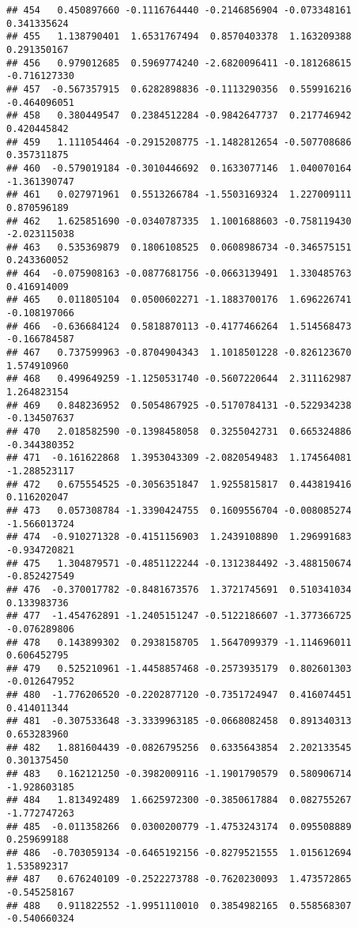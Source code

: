 \documentclass[
]{article}
\begin{document}
\begin{verbatim}
## 454   0.450897660 -0.1116764440 -0.2146856904 -0.073348161  0.341335624
## 455   1.138790401  1.6531767494  0.8570403378  1.163209388  0.291350167
## 456   0.979012685  0.5969774240 -2.6820096411 -0.181268615 -0.716127330
## 457  -0.567357915  0.6282898836 -0.1113290356  0.559916216 -0.464096051
## 458   0.380449547  0.2384512284 -0.9842647737  0.217746942  0.420445842
## 459   1.111054464 -0.2915208775 -1.1482812654 -0.507708686  0.357311875
## 460  -0.579019184 -0.3010446692  0.1633077146  1.040070164 -1.361390747
## 461   0.027971961  0.5513266784 -1.5503169324  1.227009111  0.870596189
## 462   1.625851690 -0.0340787335  1.1001688603 -0.758119430 -2.023115038
## 463   0.535369879  0.1806108525  0.0608986734 -0.346575151  0.243360052
## 464  -0.075908163 -0.0877681756 -0.0663139491  1.330485763  0.416914009
## 465   0.011805104  0.0500602271 -1.1883700176  1.696226741 -0.108197066
## 466  -0.636684124  0.5818870113 -0.4177466264  1.514568473 -0.166784587
## 467   0.737599963 -0.8704904343  1.1018501228 -0.826123670  1.574910960
## 468   0.499649259 -1.1250531740 -0.5607220644  2.311162987  1.264823154
## 469   0.848236952  0.5054867925 -0.5170784131 -0.522934238 -0.134507637
## 470   2.018582590 -0.1398458058  0.3255042731  0.665324886 -0.344380352
## 471  -0.161622868  1.3953043309 -2.0820549483  1.174564081 -1.288523117
## 472   0.675554525 -0.3056351847  1.9255815817  0.443819416  0.116202047
## 473   0.057308784 -1.3390424755  0.1609556704 -0.008085274 -1.566013724
## 474  -0.910271328 -0.4151156903  1.2439108890  1.296991683 -0.934720821
## 475   1.304879571 -0.4851122244 -0.1312384492 -3.488150674 -0.852427549
## 476  -0.370017782 -0.8481673576  1.3721745691  0.510341034  0.133983736
## 477  -1.454762891 -1.2405151247 -0.5122186607 -1.377366725 -0.076289806
## 478   0.143899302  0.2938158705  1.5647099379 -1.114696011  0.606452795
## 479   0.525210961 -1.4458857468 -0.2573935179  0.802601303 -0.012647952
## 480  -1.776206520 -0.2202877120 -0.7351724947  0.416074451  0.414011344
## 481  -0.307533648 -3.3339963185 -0.0668082458  0.891340313  0.653283960
## 482   1.881604439 -0.0826795256  0.6335643854  2.202133545  0.301375450
## 483   0.162121250 -0.3982009116 -1.1901790579  0.580906714 -1.928603185
## 484   1.813492489  1.6625972300 -0.3850617884  0.082755267 -1.772747263
## 485  -0.011358266  0.0300200779 -1.4753243174  0.095508889  0.259699188
## 486  -0.703059134 -0.6465192156 -0.8279521555  1.015612694  1.535892317
## 487   0.676240109 -0.2522273788 -0.7620230093  1.473572865 -0.545258167
## 488   0.911822552 -1.9951110010  0.3854982165  0.558568307 -0.540660324

\end{verbatim}
\end{document}
